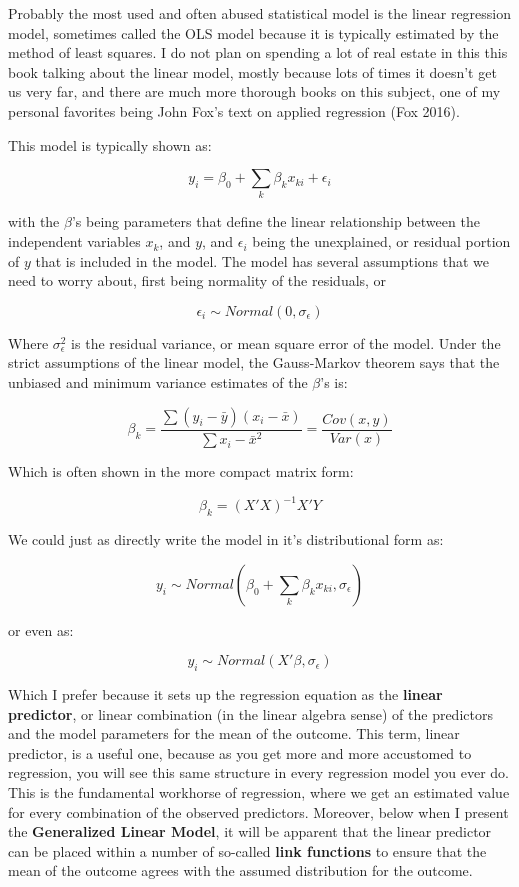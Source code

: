 \documentclass[
  letterpaper,
  DIV=11,
  numbers=noendperiod]{scrreprt}
\begin{document}
Probably the most used and often abused statistical model is the linear
regression model, sometimes called the OLS model because it is typically
estimated by the method of least squares. I do not plan on spending a
lot of real estate in this this book talking about the linear model,
mostly because lots of times it doesn't get us very far, and there are
much more thorough books on this subject, one of my personal favorites
being John Fox's text on applied regression (Fox 2016).

This model is typically shown as:

\[y_i = \beta_0 +\sum_k \beta_k x_{ki} + \epsilon_i\]

with the \(\beta\)'s being parameters that define the linear
relationship between the independent variables \(x_k\), and \(y\), and
\(\epsilon_i\) being the unexplained, or residual portion of \(y\) that
is included in the model. The model has several assumptions that we need
to worry about, first being normality of the residuals, or

\[\epsilon_i \sim Normal(0, \sigma_\epsilon)\]

Where \(\sigma_\epsilon ^2\) is the residual variance, or mean square
error of the model. Under the strict assumptions of the linear model,
the Gauss-Markov theorem says that the unbiased and minimum variance
estimates of the \(\beta\)'s is:

\[
\beta_k = \frac{\sum (y_i - \bar{y})(x_i - \bar{x})}{\sum x_i - \bar{x}^2} = \frac{Cov(x,y)}{Var(x)}
\]

Which is often shown in the more compact matrix form:

\[\beta_k = (X'X)^{-1} X'Y\]

We could just as directly write the model in it's distributional form
as:

\[
y_i \sim Normal(\beta_0 +\sum_k \beta_k x_{ki}, \sigma_\epsilon)
\]

or even as:

\[
y_i \sim Normal(X' \beta, \sigma_\epsilon)
\]

Which I prefer because it sets up the regression equation as the
\textbf{linear predictor}, or linear combination (in the linear algebra
sense) of the predictors and the model parameters for the mean of the
outcome. This term, linear predictor, is a useful one, because as you
get more and more accustomed to regression, you will see this same
structure in every regression model you ever do. This is the fundamental
workhorse of regression, where we get an estimated value for every
combination of the observed predictors. Moreover, below when I present
the \textbf{Generalized Linear Model}, it will be apparent that the
linear predictor can be placed within a number of so-called \textbf{link
functions} to ensure that the mean of the outcome agrees with the
assumed distribution for the outcome.
\end{document}
